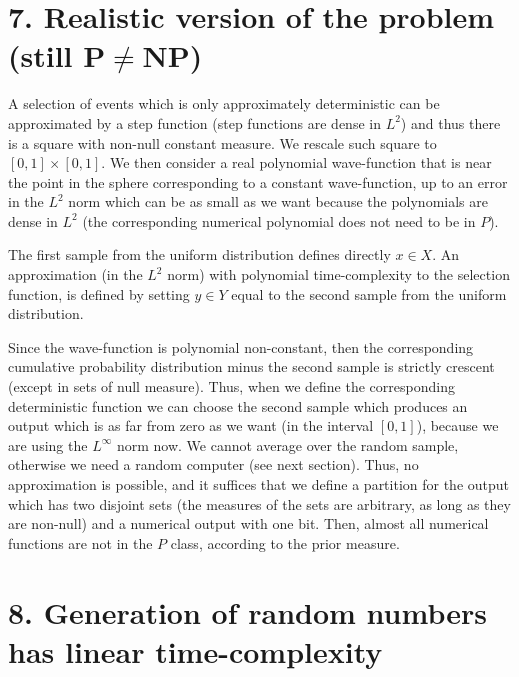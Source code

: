 \documentclass[11pt,a4paper]{report}
\begin{document}
\hypertarget{realistic-version-of-the-problem-still-pneqnp}{%
\section{\texorpdfstring{7. Realistic version of the problem (still
P\(\neq\)NP)}{7. Realistic version of the problem (still P\textbackslash neqNP)}}\label{realistic-version-of-the-problem-still-pneqnp}}

A selection of events which is only approximately deterministic can be
approximated by a step function (step functions are dense in \(L^2\))
and thus there is a square with non-null constant measure. We rescale
such square to \([0,1]\times[0,1]\). We then consider a real polynomial
wave-function that is near the point in the sphere corresponding to a
constant wave-function, up to an error in the \(L^2\) norm which can be
as small as we want because the polynomials are dense in \(L^2\) (the
corresponding numerical polynomial does not need to be in \(P\)).

The first sample from the uniform distribution defines directly
\(x\in X\). An approximation (in the \(L^2\) norm) with polynomial
time-complexity to the selection function, is defined by setting
\(y\in Y\) equal to the second sample from the uniform distribution.

Since the wave-function is polynomial non-constant, then the
corresponding cumulative probability distribution minus the second
sample is strictly crescent (except in sets of null measure). Thus, when
we define the corresponding deterministic function we can choose the
second sample which produces an output which is as far from zero as we
want (in the interval \([0,1]\)), because we are using the \(L^\infty\)
norm now. We cannot average over the random sample, otherwise we need a
random computer (see next section). Thus, no approximation is possible,
and it suffices that we define a partition for the output which has two
disjoint sets (the measures of the sets are arbitrary, as long as they
are non-null) and a numerical output with one bit. Then, almost all
numerical functions are not in the \(P\) class, according to the prior
measure.

\hypertarget{generation-of-random-numbers-has-linear-time-complexity}{%
\section{8. Generation of random numbers has linear
time-complexity}\label{generation-of-random-numbers-has-linear-time-complexity}}
\end{document}
